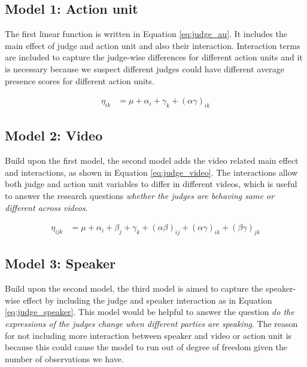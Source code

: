\documentclass{monashthesis}
\begin{document}
\hypertarget{model-1-action-unit}{%
\subsection{Model 1: Action unit}\label{model-1-action-unit}}

The first linear function is written in Equation \ref{eq:judge_au}. It includes the main effect of judge and action unit and also their interaction. Interaction terms are included to capture the judge-wise differences for different action units and it is necessary because we suspect different judges could have different average presence scores for different action units.

\begin{align}\label{eq:judge_au}
\eta_{ik} &= \mu + \alpha_i + \gamma_k + (\alpha\gamma)_{ik}
\end{align}

\hypertarget{model-2-video}{%
\subsection{Model 2: Video}\label{model-2-video}}

Build upon the first model, the second model adds the video related main effect and interactions, as shown in Equation \ref{eq:judge_video}. The interactions allow both judge and action unit variables to differ in different videos, which is useful to answer the research questions \emph{whether the judges are behaving same or different across videos}.

\begin{align}\label{eq:judge_video}
\eta_{ijk} &= \mu + \alpha_i + \beta_j +\gamma_k + (\alpha\beta)_{ij} + (\alpha\gamma)_{ik} + (\beta\gamma)_{jk}
\end{align}

\noindent 

\hypertarget{model-3-speaker}{%
\subsection{Model 3: Speaker}\label{model-3-speaker}}

Build upon the second model, the third model is aimed to capture the speaker-wise effect by including the judge and speaker interaction as in Equation \ref{eq:judge_speaker}. This model would be helpful to answer the question \emph{do the expressions of the judges change when different parties are speaking}. The reason for not including more interaction between speaker and video or action unit is because this could cause the model to run out of degree of freedom given the number of observations we have.
\end{document}
